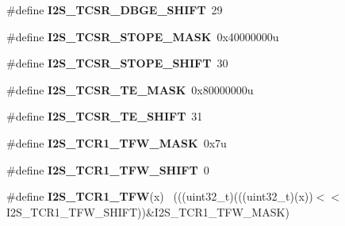 \begin{DoxyCompactItemize}
\item 
\hypertarget{group___i2_s___register___masks_ga45053916a88f0ce8d3a0798b7529f976}{}\#define {\bfseries I2\+S\+\_\+\+T\+C\+S\+R\+\_\+\+D\+B\+G\+E\+\_\+\+S\+H\+I\+F\+T}~29\label{group___i2_s___register___masks_ga45053916a88f0ce8d3a0798b7529f976}

\item 
\hypertarget{group___i2_s___register___masks_ga2692628bf911b8951e8f77dbd6809f87}{}\#define {\bfseries I2\+S\+\_\+\+T\+C\+S\+R\+\_\+\+S\+T\+O\+P\+E\+\_\+\+M\+A\+S\+K}~0x40000000u\label{group___i2_s___register___masks_ga2692628bf911b8951e8f77dbd6809f87}

\item 
\hypertarget{group___i2_s___register___masks_ga931d31ce7c806e53554e29d7cf0db6ed}{}\#define {\bfseries I2\+S\+\_\+\+T\+C\+S\+R\+\_\+\+S\+T\+O\+P\+E\+\_\+\+S\+H\+I\+F\+T}~30\label{group___i2_s___register___masks_ga931d31ce7c806e53554e29d7cf0db6ed}

\item 
\hypertarget{group___i2_s___register___masks_ga38911a5988cffd69ad0817c00522518c}{}\#define {\bfseries I2\+S\+\_\+\+T\+C\+S\+R\+\_\+\+T\+E\+\_\+\+M\+A\+S\+K}~0x80000000u\label{group___i2_s___register___masks_ga38911a5988cffd69ad0817c00522518c}

\item 
\hypertarget{group___i2_s___register___masks_gab02a94b13756ac9869d4125313c7d651}{}\#define {\bfseries I2\+S\+\_\+\+T\+C\+S\+R\+\_\+\+T\+E\+\_\+\+S\+H\+I\+F\+T}~31\label{group___i2_s___register___masks_gab02a94b13756ac9869d4125313c7d651}

\item 
\hypertarget{group___i2_s___register___masks_ga26d9f7626514208432dc7850225cc752}{}\#define {\bfseries I2\+S\+\_\+\+T\+C\+R1\+\_\+\+T\+F\+W\+\_\+\+M\+A\+S\+K}~0x7u\label{group___i2_s___register___masks_ga26d9f7626514208432dc7850225cc752}

\item 
\hypertarget{group___i2_s___register___masks_ga2a0a40da6ee3bcfa9f8088dcfbb676c7}{}\#define {\bfseries I2\+S\+\_\+\+T\+C\+R1\+\_\+\+T\+F\+W\+\_\+\+S\+H\+I\+F\+T}~0\label{group___i2_s___register___masks_ga2a0a40da6ee3bcfa9f8088dcfbb676c7}

\item 
\hypertarget{group___i2_s___register___masks_gab5159a5116071bed637234b0f766bebd}{}\#define {\bfseries I2\+S\+\_\+\+T\+C\+R1\+\_\+\+T\+F\+W}(x)                                                ~(((uint32\+\_\+t)(((uint32\+\_\+t)(x))$<$$<$I2\+S\+\_\+\+T\+C\+R1\+\_\+\+T\+F\+W\+\_\+\+S\+H\+I\+F\+T))\&I2\+S\+\_\+\+T\+C\+R1\+\_\+\+T\+F\+W\+\_\+\+M\+A\+S\+K)\label{group___i2_s___register___masks_gab5159a5116071bed637234b0f766bebd}


\end{DoxyCompactItemize}
